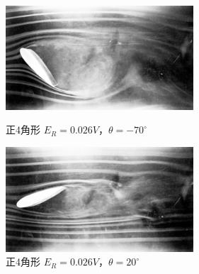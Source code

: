 \documentclass[twocolumn,10pt,a4j]{jsarticle}
\begin{document}
\begin{figure}[htbp]
\begin{minipage}{0.5\hsize}
          \begin{center}
            \includegraphics[width=7cm]{../img/kashika/010.jpg}
            \caption{正4角形 $E_{R}=0.026V， \theta=-70^\circ$}
          \end{center}
        \end{minipage}
        \begin{minipage}{0.5\hsize}
          \begin{center}
            \includegraphics[width=7cm]{../img/kashika/011.jpg}
            \caption{正4角形 $E_{R}=0.026V， \theta=20^\circ$}
          \end{center}
        \end{minipage}
      \end{figure}
\end{document}
